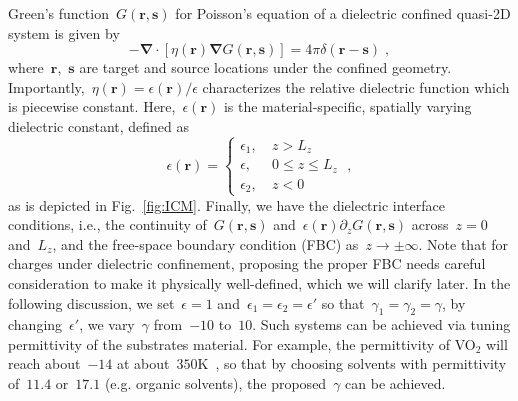 \documentclass[aps,prl,reprint,showpacs,floatfix,superscriptaddress]{revtex4-2}
\newcommand{\V}[1]{\boldsymbol{#1}} %
\newcommand{\M}[1]{\boldsymbol{#1}} %
\renewcommand{\d}[1]{\delta#1} %
\newcommand{\grad}{\M{\nabla}} %
\newcommand{\eps}{\epsilon}
\begin{document}
Green's function~$G(\V{r},\V{s})$ for Poisson's equation of a dielectric confined quasi-2D system is given by
\begin{equation}
    -\grad\cdot\left[\eta(\V r) \grad G(\V{r},\V{s})\right] = 4 \pi \d(\V r - \V s )\;,\label{eq:Green4Poisson}
\end{equation}
where~$\V{r}$,~$\V{s}$ are target and source locations under the confined geometry.
Importantly,~$\eta(\V r) = \eps(\V{r}) / \eps$ characterizes the relative dielectric function which is piecewise constant.
Here,~$\eps(\V{r})$ is the material-specific, spatially varying dielectric constant, defined as 
\begin{equation}
    \eps(\V{r}) = \left\{
    \begin{array}{cc}
        \eps_1,~ & z > L_z \\
        \eps,~ & 0 \leq z \leq L_z \\
        \eps_2,~ & z < 0
    \end{array}
    \right. \;,
\end{equation}
as is depicted in Fig.~\ref{fig:ICM}. 
Finally, we have the dielectric interface conditions, i.e., the continuity of~$G(\V r, \V s)$ and~$\epsilon(\V r)\partial_z G(\V r, \V s)$ across~$z= 0$ and~$L_z$, and the free-space boundary condition (FBC) as~$z\to\pm\infty$. 
Note that for charges under dielectric confinement, proposing the proper FBC needs careful consideration to make it physically well-defined, which we will clarify later.
In the following discussion, we set~$\eps = 1$ and~$\eps_1 = \eps_2 = \eps'$ so that~$\gamma_1 = \gamma_2 = \gamma$, by changing~$\eps'$, we vary~$\gamma$ from~$-10$ to~$10$.
Such systems can be achieved via tuning permittivity of the substrates material.
For example, the permittivity of VO$_2$ will reach about~$-14$ at about~$350$K~\cite{kana2016thermally}, so that by choosing solvents with permittivity of~$11.4$ or~$17.1$ (e.g. organic solvents), the proposed~$\gamma$ can be achieved.
\end{document}
